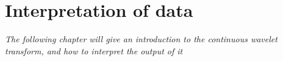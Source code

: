 \chapter{Interpretation of data}
\textit{The following chapter will give an introduction to the continuous wavelet transform, and how to interpret the output of it}